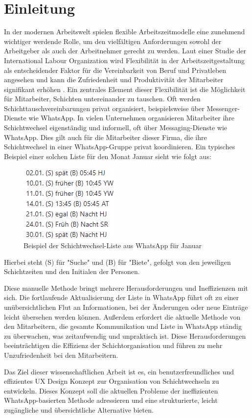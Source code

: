 \chapter{Einleitung}

In der modernen Arbeitswelt spielen flexible Arbeitszeitmodelle eine zunehmend wichtiger werdende Rolle, um den vielfältigen Anforderungen sowohl der Arbeitgeber als auch der Arbeitnehmer gerecht zu werden. 
Laut einer Studie der International Labour Organization wird Flexibilität in der Arbeitszeitgestaltung als entscheidender Faktor für die Vereinbarkeit von Beruf und Privatleben angesehen und kann die Zufriedenheit und Produktivität der Mitarbeiter signifikant erhöhen \cite[S.12 ff.]{ilo2018}. 
Ein zentrales Element dieser Flexibilität ist die Möglichkeit für Mitarbeiter, Schichten untereinander zu tauschen. 
Oft werden Schichttauschvereinbarungen privat organisiert, beispielsweise über Messenger-Dienste wie WhatsApp. 
In vielen Unternehmen organisieren Mitarbeiter ihre Schichtwechsel eigenständig und informell, oft über Messaging-Dienste wie WhatsApp. Dies gilt auch für die Mitarbeiter dieser Firma, die ihre Schichtwechsel in einer WhatsApp-Gruppe privat koordinieren. Ein typisches Beispiel einer solchen Liste für den Monat Januar sieht wie folgt aus:

\begin{figure}[h]
    \centering
    \includegraphics[clip,width=0.25\linewidth]{images/WhatsAppListe.png}
    \caption[Beispiel der Schichtwechsel-Liste aus WhatsApp für Januar]{Beispiel der Schichtwechsel-Liste aus WhatsApp für Januar}
    \label{WhatsAppListe}
\end{figure}

Hierbei steht (S) für "Suche" und (B) für "Biete", gefolgt von den jeweiligen Schichtzeiten und den Initialen der Personen.

Diese manuelle Methode bringt mehrere Herausforderungen und Ineffizienzen mit sich. Die fortlaufende Aktualisierung der Liste in WhatsApp führt oft zu einer unübersichtlichen Flut an Informationen, bei der Änderungen oder neue Einträge leicht übersehen werden können. 
Außerdem erfordert die aktuelle Methode von den Mitarbeitern, die gesamte Kommunikation und Liste in WhatsApp ständig zu überwachen, was zeitaufwendig und unpraktisch ist. Diese Herausforderungen beeinträchtigen die Effizienz der Schichtorganisation und führen zu mehr Unzufriedenheit bei den Mitarbeitern.

Das Ziel dieser wissenschaftlichen Arbeit ist es, ein benutzerfreundliches und effizientes UX Design Konzept zur Organisation von Schichtwechseln zu entwickeln. Dieses Konzept soll die aktuellen Probleme der ineffizienten WhatsApp-basierten Methode adressieren und eine strukturierte, leicht zugängliche und übersichtliche Alternative bieten.
